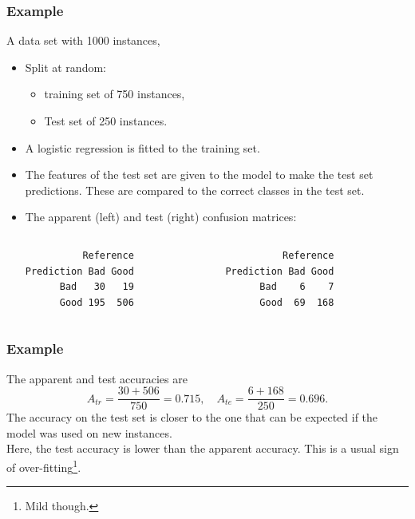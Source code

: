 \begin{frame}[fragile]
\frametitle{Example}
A data set with 1000 instances,
\begin{itemize}
\item Split at random: 
\begin{itemize}
\item training set of 750 instances,
\item Test set of 250 instances. 
\end{itemize}
\item A logistic regression is fitted to the training set. 
\item The features of the test set are given to the model to make the test set predictions. These are compared to the correct classes in the test set. 
\item The apparent (left) and test (right) confusion matrices:\\
\scriptsize
\begin{columns}
\begin{column}{0.5\textwidth}
\begin{verbatim}
          Reference
Prediction Bad Good
      Bad   30   19
      Good 195  506
\end{verbatim}
\end{column}
\begin{column}{0.5\textwidth}
\begin{verbatim}
          Reference
Prediction Bad Good
      Bad    6    7
      Good  69  168
\end{verbatim}
\end{column}
\end{columns}
\normalsize
\end{itemize}
\end{frame}
\begin{frame}
\frametitle{Example}
The apparent and test accuracies are
$$
A_{tr} = \frac{30+506}{750} = 0.715, \quad
A_{te} = \frac{6+168}{250} = 0.696.
$$
The accuracy on the test set is closer to the one that can be expected if the model was used on new instances.\\
\vspace{0.3cm}
Here, the test accuracy is lower than the apparent accuracy. This is a usual sign of over-fitting\footnote{Mild though.}.
\end{frame}
